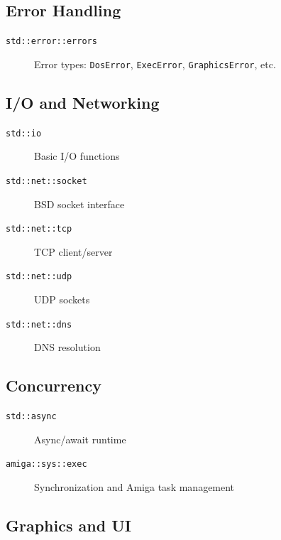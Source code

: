 \subsection{Error Handling}
\label{subsec:error-modules}

\begin{description}
    \item[\texttt{std::error::errors}] Error types: \texttt{DosError}, \texttt{ExecError}, \texttt{GraphicsError}, etc.
\end{description}

\subsection{I/O and Networking}
\label{subsec:io-modules}

\begin{description}
    \item[\texttt{std::io}] Basic I/O functions
    \item[\texttt{std::net::socket}] BSD socket interface
    \item[\texttt{std::net::tcp}] TCP client/server
    \item[\texttt{std::net::udp}] UDP sockets
    \item[\texttt{std::net::dns}] DNS resolution
\end{description}

\subsection{Concurrency}
\label{subsec:concurrency-modules}

\begin{description}
    \item[\texttt{std::async}] Async/await runtime
    \item[\texttt{amiga::sys::exec}] Synchronization and Amiga task management
\end{description}

\subsection{Graphics and UI}
\label{subsec:graphics-modules}


